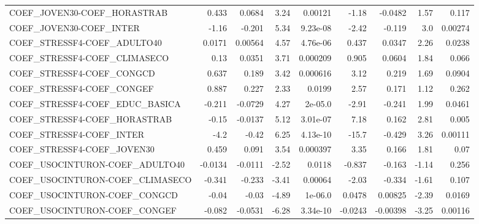 \begin{tabular}{lrrrrrrrr}
COEF\_JOVEN30-COEF\_HORASTRAB           &       0.433 &       0.0684 &    3.24 &  0.00121 &      -1.18 &     -0.0482 &         1.57 &         0.117 \\
COEF\_JOVEN30-COEF\_INTER               &       -1.16 &       -0.201 &    5.34 & 9.23e-08 &      -2.42 &      -0.119 &          3.0 &       0.00274 \\
COEF\_STRESSF4-COEF\_ADULTO40           &      0.0171 &      0.00564 &    4.57 & 4.76e-06 &      0.437 &      0.0347 &         2.26 &        0.0238 \\
COEF\_STRESSF4-COEF\_CLIMASECO          &        0.13 &       0.0351 &    3.71 & 0.000209 &      0.905 &      0.0604 &         1.84 &         0.066 \\
COEF\_STRESSF4-COEF\_CONGCD             &       0.637 &        0.189 &    3.42 & 0.000616 &       3.12 &       0.219 &         1.69 &        0.0904 \\
COEF\_STRESSF4-COEF\_CONGEF             &       0.887 &        0.227 &    2.33 &   0.0199 &       2.57 &       0.171 &         1.12 &         0.262 \\
COEF\_STRESSF4-COEF\_EDUC\_BASICA        &      -0.211 &      -0.0729 &    4.27 &  2e-05.0 &      -2.91 &      -0.241 &         1.99 &        0.0461 \\
COEF\_STRESSF4-COEF\_HORASTRAB          &       -0.15 &      -0.0137 &    5.12 & 3.01e-07 &       7.18 &       0.162 &         2.81 &         0.005 \\
COEF\_STRESSF4-COEF\_INTER              &        -4.2 &        -0.42 &    6.25 & 4.13e-10 &      -15.7 &      -0.429 &         3.26 &       0.00111 \\
COEF\_STRESSF4-COEF\_JOVEN30            &       0.459 &        0.091 &    3.54 & 0.000397 &       3.35 &       0.166 &         1.81 &          0.07 \\
COEF\_USOCINTURON-COEF\_ADULTO40        &     -0.0134 &      -0.0111 &   -2.52 &   0.0118 &     -0.837 &      -0.163 &        -1.14 &         0.256 \\
COEF\_USOCINTURON-COEF\_CLIMASECO       &      -0.341 &       -0.233 &   -3.41 &  0.00064 &      -2.03 &      -0.334 &        -1.61 &         0.107 \\
COEF\_USOCINTURON-COEF\_CONGCD          &       -0.04 &        -0.03 &   -4.89 &  1e-06.0 &     0.0478 &     0.00825 &        -2.39 &        0.0169 \\
COEF\_USOCINTURON-COEF\_CONGEF          &      -0.082 &      -0.0531 &   -6.28 & 3.34e-10 &    -0.0243 &    -0.00398 &        -3.25 &       0.00116 \\

\end{tabular}
